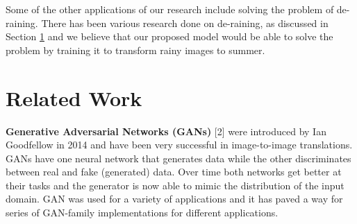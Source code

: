 \documentclass{article}
\begin{document}


Some of the other applications of our research include solving the problem of de-raining. There has been various research 
 done on de-raining, as discussed in Section \ref{relatedworks} and we believe that our proposed model would be able to solve the problem by training it to transform rainy images to summer.




\section{Related Work}
\label{relatedworks}

\textbf{Generative Adversarial Networks (GANs)} [2] were introduced by  Ian Goodfellow in 2014 and have been very successful in image-to-image translations. GANs have one neural network that generates data while the other discriminates between real and fake (generated) data. Over time both networks get better at their tasks and the generator is now able to mimic the distribution of the input domain. GAN was used for a variety of applications and it has paved a way for series of GAN-family implementations for different applications.
\end{document}

